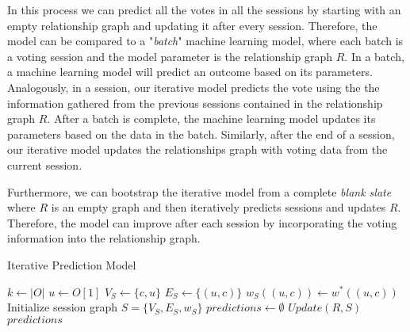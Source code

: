 In this process we can predict all the votes in all the sessions by starting with an empty relationship graph and updating it after every session.
Therefore, the model can be compared to a "\textit{batch}" machine learning model, where each batch is a voting session and the model parameter is the relationship graph $R$.
In a batch, a machine learning model will predict an outcome based on its parameters.
Analogously, in a session, our iterative model predicts the vote using the the information gathered from the previous sessions contained in the relationship graph $R$.
After a batch is complete, the machine learning model updates its parameters based on the data in the batch.
Similarly, after the end of a session, our iterative model updates the relationships graph with voting data from the current session.

Furthermore, we can bootstrap the iterative model from a complete \textit{blank slate} where $R$ is an empty graph and then iteratively predicts sessions and updates $R$.
Therefore, the model can improve after each session by incorporating the voting information into the relationship graph.

\begin{algorithm}[htp]
    \DontPrintSemicolon
    \caption{Iterative Prediction Model}
    \label{alg:iterative-pred}
    $k \leftarrow |O|$\;
    $u \leftarrow O[1]$  
    $V_S \leftarrow \{c,u\}$ 
    $E_S \leftarrow \{(u,c)\}$ 
    $w_S((u,c)) \leftarrow w^{*}((u,c))$ 
    Initialize session graph $S = \{V_S,E_S,w_S\}$\; \label{iterative-pred:line:init-session}
    $predictions \leftarrow \emptyset$ \;
    $Update(R,S)$  \label{iterative-pred:line:update-relation}
    \Return $predictions$\;
\end{algorithm}

